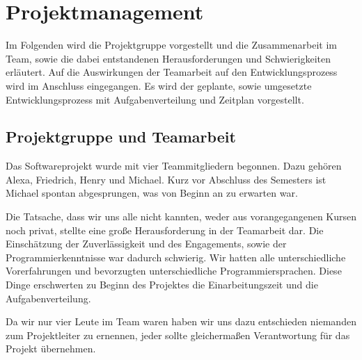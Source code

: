 \section{Projektmanagement}
\label{sec:projektmanagement}

Im Folgenden wird die Projektgruppe vorgestellt und die Zusammenarbeit im Team, sowie die dabei entstandenen Herausforderungen und Schwierigkeiten erläutert. Auf die Auswirkungen der Teamarbeit auf den Entwicklungsprozess wird im Anschluss eingegangen. Es wird der geplante, sowie umgesetzte Entwicklungsprozess mit Aufgabenverteilung und Zeitplan vorgestellt.

\subsection{Projektgruppe und Teamarbeit}
\label{subsec:teammitglieder}

Das Softwareprojekt wurde mit vier Teammitgliedern begonnen. Dazu gehören Alexa, Friedrich, Henry und Michael. Kurz vor Abschluss des Semesters ist Michael spontan abgesprungen, was von Beginn an zu erwarten war.

Die Tatsache, dass wir uns alle nicht kannten, weder aus vorangegangenen Kursen noch privat, stellte eine große Herausforderung in der Teamarbeit dar. Die Einschätzung der Zuverlässigkeit und des Engagements, sowie der Programmierkenntnisse war dadurch schwierig. Wir hatten alle unterschiedliche Vorerfahrungen und bevorzugten unterschiedliche Programmiersprachen. Diese Dinge erschwerten zu Beginn des Projektes die Einarbeitungszeit und die Aufgabenverteilung.

Da wir nur vier Leute im Team waren haben wir uns dazu entschieden niemanden zum Projektleiter zu ernennen, jeder sollte gleichermaßen Verantwortung für das Projekt übernehmen.


